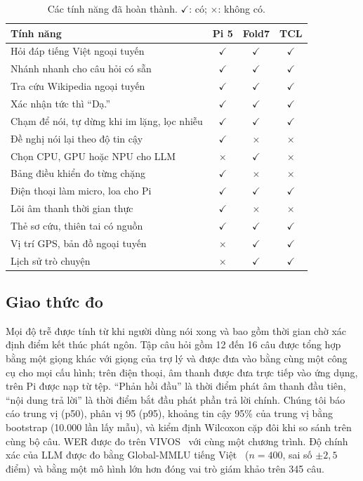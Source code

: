 \documentclass[a4paper,12pt,twocolumn]{article}
\begin{document}
\begin{table}[t]\centering\small
\caption{Các tính năng đã hoàn thành. $\checkmark$: có; $\times$: không có.}\label{tab:feat}
\setlength{\tabcolsep}{3pt}
\begin{tabular}{@{}L{51mm}ccc@{}}\toprule
Tính năng & Pi 5 & Fold7 & TCL\\\midrule
Hỏi đáp tiếng Việt ngoại tuyến & $\checkmark$ & $\checkmark$ & $\checkmark$\\
Nhánh nhanh cho câu hỏi có sẵn & $\checkmark$ & $\checkmark$ & $\checkmark$\\
Tra cứu Wikipedia ngoại tuyến & $\checkmark$ & $\checkmark$ & $\checkmark$\\
Xác nhận tức thì ``Dạ.'' & $\checkmark$ & $\checkmark$ & $\checkmark$\\
Chạm để nói, tự dừng khi im lặng, lọc nhiễu & $\checkmark$ & $\checkmark$ & $\checkmark$\\
Đề nghị nói lại theo độ tin cậy & $\checkmark$ & $\times$ & $\times$\\
Chọn CPU, GPU hoặc NPU cho LLM & $\times$ & $\checkmark$ & $\times$\\
Bảng điều khiển đo từng chặng & $\checkmark$ & $\times$ & $\times$\\
Điện thoại làm micro, loa cho Pi & $\checkmark$ & $\checkmark$ & $\checkmark$\\
Lõi âm thanh thời gian thực & $\checkmark$ & $\times$ & $\times$\\
Thẻ sơ cứu, thiên tai có nguồn & $\checkmark$ & $\checkmark$ & $\checkmark$\\
Vị trí GPS, bản đồ ngoại tuyến & $\times$ & $\checkmark$ & $\checkmark$\\
Lịch sử trò chuyện & $\times$ & $\checkmark$ & $\checkmark$\\\bottomrule
\end{tabular}
\end{table}



\subsection{Giao thức đo}
Mọi độ trễ được tính từ khi người dùng nói xong và bao gồm thời gian chờ xác định điểm kết thúc phát ngôn. Tập câu hỏi gồm 12 đến 16 câu được tổng hợp bằng một giọng khác với giọng của trợ lý và được đưa vào bằng cùng một công cụ cho mọi cấu hình; trên điện thoại, âm thanh được đưa trực tiếp vào ứng dụng, trên Pi được nạp từ tệp. ``Phản hồi đầu'' là thời điểm phát âm thanh đầu tiên, ``nội dung trả lời'' là thời điểm bắt đầu phát phần trả lời chính. Chúng tôi báo cáo trung vị (p50), phân vị 95 (p95), khoảng tin cậy 95\% của trung vị bằng bootstrap (10.000 lần lấy mẫu), và kiểm định Wilcoxon cặp đôi khi so sánh trên cùng bộ câu. WER được đo trên VIVOS~\cite{vivos} với cùng một chương trình. Độ chính xác của LLM được đo bằng Global-MMLU tiếng Việt~\cite{gmmlu} ($n=400$, sai số $\pm 2{,}5$ điểm) và bằng một mô hình lớn hơn đóng vai trò giám khảo trên 345 câu.
\end{document}
